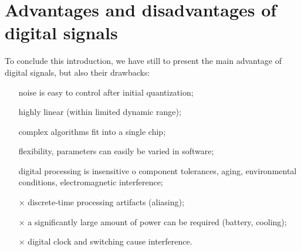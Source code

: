 \documentclass[../../main/main.tex]{subfiles}
\begin{document}
\section{Advantages and disadvantages of digital signals}
To conclude this introduction, we have still to present the main advantage of digital signals, but also their drawbacks:
\begin{itemize}
    \item[{\color{dartmouthgreen}\checkmark}] noise is easy to control after initial quantization;
    \item[{\color{dartmouthgreen}\checkmark}] highly linear (within limited dynamic range);
    \item[{\color{dartmouthgreen}\checkmark}] complex algorithms fit into a single chip;
    \item[{\color{dartmouthgreen}\checkmark}] flexibility, parameters can easily be varied in software;
    \item[{\color{dartmouthgreen}\checkmark}] digital processing is insensitive o component tolerances, aging, environmental conditions, electromagnetic interference;
    \item[{\color{red}\( \bm{\times} \)}] discrete-time processing artifacts (aliasing);
    \item[{\color{red}\( \bm{\times} \)}] a significantly large amount of power can be required (battery, cooling);
    \item[{\color{red}\( \bm{\times} \)}] digital clock and switching cause interference.
\end{itemize}
\end{document}

